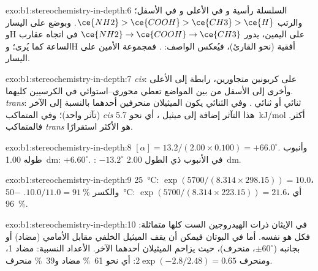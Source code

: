 \begin{solution}{exo:b1:stereochemistry-in-depth:6}
السلسلة رأسية و في الأعلى و في الأسفل؛ والرتب
$\ce{NH2} > \ce{COOH} > \ce{CH3} > \ce{H}$. وبوضع  على اليسار
وH على اليمين، يدور $\ce{NH2} \to \ce{COOH} \to \ce{CH3}$ في اتجاه عقارب الساعة
كما يُرى؛ وH أفقية (نحو القارئ)، فيُعكس
الواصف: . فمجموعة الأمين على اليسار.
\end{solution}

\begin{solution}{exo:b1:stereochemistry-in-depth:7}
\textit{cis}: على كربونين متجاورين، رابطة إلى الأعلى وأخرى إلى الأسفل من بين المواضع 
 تعطي محوري--استوائي في الكرسيين كليهما.
\textit{trans}: ثنائي  أو ثنائي . وفي  الثنائي  يكون
الميثيلان منحرفين أحدهما بالنسبة إلى الآخر (تآثر واحد)؛ وفي المتماكب \textit{cis}
هذا التآثر إضافة إلى ميثيل ، أي نحو \qty{5.7}{kJ/mol}
أكثر. فالمتماكب \textit{trans} هو الأكثر استقرارًا.
\end{solution}

\begin{solution}{exo:b1:stereochemistry-in-depth:8}
$[\alpha] = 13.2/(2.00 \times 0.100) = +66.0^\circ$. وأنبوب طوله \qty{1.00}{dm}:
$+6.60^\circ$. : $-13.2^\circ$ في الأنبوب ذي الطول \qty{2.00}{dm}.
\end{solution}

\begin{solution}{exo:b1:stereochemistry-in-depth:9}
\qty{25}{\celsius}: $\exp(5700/(8.314 \times 298.15)) = 10.0$، والكسر
$10.0/11.0 = \qty{91}{\percent}$. \qty{-50}{\celsius}: $\exp(5700/(8.314
\times 223.15)) = 21.6$، أي \qty{96}{\percent}.
\end{solution}

\begin{solution}{exo:b1:stereochemistry-in-depth:10}
في الإيثان ذرات الهيدروجين الست كلها متماثلة: فكل 
هو  نفسه. أما في البوتان فيمكن أن يقف الميثيل الخلفي مقابل الأمامي
(مضاد) أو بجانبه ($\pm 60^\circ$، منحرف)، حيث يزاحم الميثيلان
أحدهما الآخر. الأعداد النسبية: مضاد 1، ومنحرف $2\exp(-2.8/2.48) = 0.65$: أي نحو
\qty{61}{\percent} مضاد و\qty{39}{\percent} منحرف.
\end{solution}

